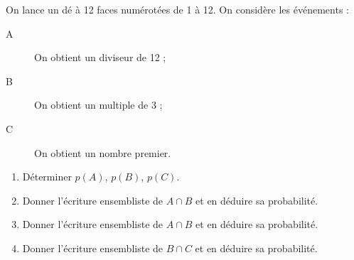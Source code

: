 
On lance un dé à 12 faces numérotées de 1 à 12. On considère les événements :

\begin{description}
\item[A] On obtient un diviseur de 12 ;
\item[B] On obtient un multiple de 3 ;
\item[C] On obtient un nombre premier.
\end{description}

\begin{enumerate}
\item Déterminer $p(A)$, $p(B)$, $p(C)$. 
\item Donner l'écriture ensembliste de $A \cap B$ et en déduire sa probabilité. 
\item Donner l'écriture ensembliste de $A \cap B$ et en déduire sa probabilité.
\item Donner l'écriture ensembliste de $B \cap C$ et en déduire sa probabilité.
\end{enumerate}